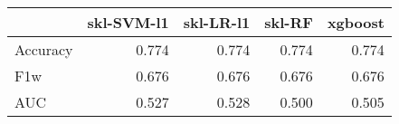 \begin{tabular}{lrrrr}
\toprule
{} &  skl-SVM-l1 &  skl-LR-l1 &  skl-RF &  xgboost \\
\midrule
Accuracy &       0.774 &      0.774 &   0.774 &    0.774 \\
F1w      &       0.676 &      0.676 &   0.676 &    0.676 \\
AUC      &       0.527 &      0.528 &   0.500 &    0.505 \\
\bottomrule
\end{tabular}

